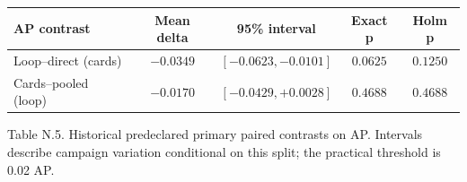 \begin{center}\footnotesize\setlength{\tabcolsep}{4pt}
\begin{tabular}{lcccc}
\toprule
AP contrast & Mean delta & 95\% interval & Exact p & Holm p \\
\midrule
Loop--direct (cards) & $-0.0349$ & $[-0.0623, -0.0101]$ & $0.0625$ & $0.1250$ \\
Cards--pooled (loop) & $-0.0170$ & $[-0.0429, +0.0028]$ & $0.4688$ & $0.4688$ \\
\bottomrule
\end{tabular}
\end{center}
Table N.5. Historical predeclared primary paired contrasts on AP. Intervals describe campaign variation conditional on this split; the practical threshold is 0.02 AP.
